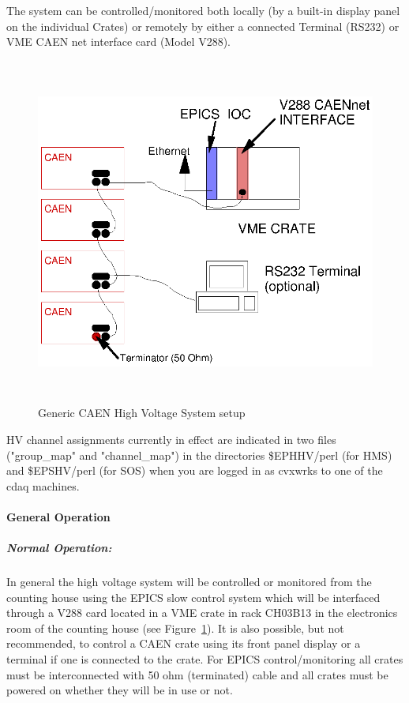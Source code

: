 The system can be controlled/monitored both locally (by a built-in
display panel on the individual Crates) or remotely by either a
connected Terminal (RS232) or VME CAEN net interface card (Model V288).


\begin{figure}
\includegraphics[height=4.5in]{CAENHV.ps}
\caption{Generic CAEN High Voltage System setup\label{fig:caen_setup}}
\end{figure}

HV channel assignments currently in effect are indicated in 
two files ("group\_map" and
"channel\_map") in the directories \$EPHHV/perl (for HMS) and \$EPSHV/perl (for
SOS) when you are logged in as cvxwrks to one of the cdaq machines.

\paragraph{General Operation}

\subparagraph{Normal Operation:}

In general the high voltage system will be controlled or monitored
from the counting house using the EPICS slow control system which will
be interfaced through a V288 card located in a VME crate in rack CH03B13
in the electronics room of the counting house
(see Figure~\ref{fig:caen_setup}).  It is also possible, but not recommended,
to control a CAEN crate using its front panel display or a terminal
if one is connected to the crate.
For EPICS control/monitoring all crates must be interconnected with 50
ohm (terminated) cable and all crates must be powered on whether they
will be in use or not.

